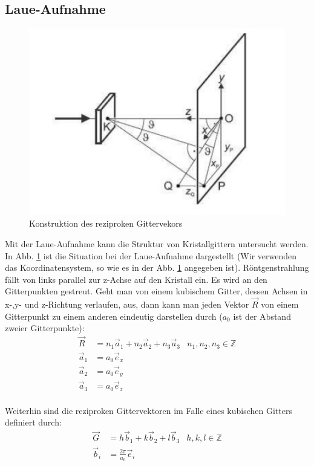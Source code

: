 \subsection{Laue-Aufnahme}
\begin{figure}
\centering
\includegraphics[scale=0.5]{data/laue/th_laue.png}
\caption{Konstruktion des reziproken Gittervekors \cite{praktikumsheft}}
\label{fig:laue_th}
\end{figure}
Mit der Laue-Aufnahme kann die Struktur von Kristallgittern untersucht werden. In Abb. \ref{fig:laue_th} ist die Situation bei der Laue-Aufnahme dargestellt (Wir verwenden das Koordinatensystem, so wie es in der Abb. \ref{fig:laue_th} angegeben ist). Röntgenstrahlung fällt von links parallel zur z-Achse auf den Kristall ein. Es wird an den Gitterpunkten gestreut. Geht man von einem kubischem Gitter, dessen Achsen in x-,y- und z-Richtung verlaufen, aus, dann kann man jeden Vektor $\vec{R}$ von einem Gitterpunkt zu einem anderen eindeutig darstellen durch ($a_0$ ist der Abstand zweier Gitterpunkte):
\begin{align*}
\vec{R} &= n_1\vec{a}_1 + n_2\vec{a}_2 + n_3\vec{a}_3 & n_1,n_2,n_3 \in \mathbb{Z}\\
	\vec{a}_1 &= a_0\vec{e}_x\\
	\vec{a}_2 &= a_0\vec{e}_y\\
	\vec{a}_3 &= a_0\vec{e}_z\\ 
\end{align*}

Weiterhin sind die reziproken Gittervektoren im Falle eines kubischen Gitters definiert durch:
\begin{align*}
\vec{G} &= h\vec{b}_1 + k\vec{b}_2 + l\vec{b}_3 & h,k,l \in \mathbb{Z}\\
\vec{b}_i &= \frac{2\pi}{a_0} \vec{e}_i
\end{align*}

